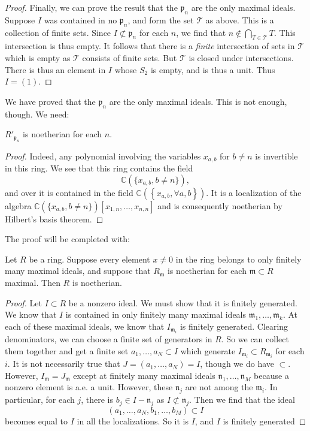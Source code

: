 \begin{proof}
Finally, we can prove the result that the $\mathfrak{p}_n$ are the only maximal
ideals. Suppose $I$ was contained in no $\mathfrak{p}_n$, and form the set
$\mathcal{T}$ as above. This is a collection of finite sets. Since $I
\not\subset \mathfrak{p}_n$ for each $n$, we find that $n \notin \bigcap_{T \in
\mathcal{T}} T$. This intersection is thus empty. It follows that there is a
\emph{finite} intersection of sets in $\mathcal{T}$
which is empty as $\mathcal{T}$ consists of finite sets. But $\mathcal{T}$ is closed under intersections. There is thus
an element in $I$ whose $S_2$ is empty, and is thus a unit. Thus $I = (1)$.
\end{proof} 

We have proved that the $\mathfrak{p}_n$ are the only maximal ideals. This is
not enough, though. We need:
\begin{lemma} 
$R'_{\mathfrak{p}_n}$ is noetherian for each $n$. 
\end{lemma} 
\begin{proof} 
Indeed, any polynomial involving the variables $x_{a,b}$ for $ b \neq n$ is
invertible in this ring. We see that this ring contains the field
\[ \mathbb{C}(\{x_{a,b}, b \neq n\}),  \]
and over it is contained in the field $\mathbb{C}(\left\{x_{a,b}, \forall
a,b\right\})$. It is a localization of the algebra $\mathbb{C}(\{x_{a,b}, b
\neq n\})[x_{1,n} , \dots, x_{n,n}]$ and is consequently noetherian by
Hilbert's basis theorem.
\end{proof} 

The proof will be completed with:
\begin{lemma} 
Let $R$ be a ring. Suppose every element $x \neq 0$ in the ring belongs to only
finitely many maximal ideals, and suppose that $R_{\mathfrak{m}}$ is noetherian
for each $\mathfrak{m} \subset R$ maximal. Then $R$ is noetherian. 
\end{lemma} 
\begin{proof} 
Let $I \subset R$ be a nonzero ideal. We must show that it is finitely generated. We
know that $I$ is contained in only finitely many maximal ideals $\mathfrak{m}_1
, \dots , \mathfrak{m}_k$. 
At each of these maximal ideals, we know that $I_{\mathfrak{m}_i}$ is finitely
generated. Clearing denominators, we can choose a finite set of generators in
$R$. So we can collect them together and get a finite set $a_1, \dots, a_N
\subset I$
which generate $I_{\mathfrak{m}_i} \subset R_{\mathfrak{m}_i}$ for each $i$. It
is not necessarily true that $J = (a_1, \dots, a_N) = I$, though we do have
$\subset$. However, $I_{\mathfrak{m}} = J_{\mathfrak{m}}$ except at finitely
many maximal ideals $\mathfrak{n}_1, \dots, \mathfrak{n}_M$ because a nonzero
element is a.e. a unit. However, these $\mathfrak{n}_j$ are not among the
$\mathfrak{m}_i$. In particular, for each $j$, there is $b_j \in I -
\mathfrak{n}_j$ as $I \not\subset \mathfrak{n}_j$. Then we find that the ideal
\[ (a_1, \dots, a_N, b_1, \dots, b_M) \subset I \]
becomes equal to $I$ in all the localizations. So it is $I$, and $I$ is finitely generated 

\end{proof} 

